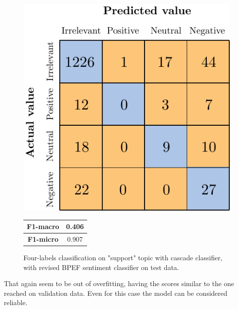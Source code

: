 \begin{figure}[H]
	\begin{minipage}[b]{0.6\linewidth}
		\centering
		\includegraphics[scale=1]{figures/conf_matrices/ita_support/ita_cascade_support_bpef_tst.pdf}
	\end{minipage}
	\begin{minipage}[b]{0.3\linewidth}
		\begin{tabular}[b]{ | c | c | } 
			\hline
			\textbf{F1-macro} & 0.406 \\
			\hline
			\textbf{F1-micro} & 0.907 \\ 
			\hline
		\end{tabular}
	\end{minipage}
	\caption{Four-labels classification on "support" topic with cascade classifier, with revised BPEF sentiment classifier on test data.}
	\label{fig:ita_cascade_support_bpef_tst}
\end{figure}


That again seem to be out of overfitting, having the scores similar to the one reached on validation data. Even for this case the model can be considered reliable.

